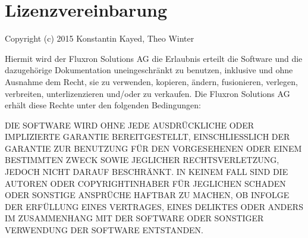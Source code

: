 \WFclear
\pagebreak
\section{Lizenzvereinbarung}
\label{Lizenzvereinbarung}

Copyright (c) 2015 Konstantin Kayed, Theo Winter

Hiermit wird der Fluxron Solutions AG die Erlaubnis erteilt die Software und die dazugehörige Dokumentation uneingeschränkt zu benutzen, inklusive und ohne Ausnahme dem Recht, sie zu verwenden, kopieren, ändern, fusionieren, verlegen, verbreiten, unterlizenzieren und/oder zu verkaufen. Die Fluxron Solutions AG erhält diese Rechte unter den folgenden Bedingungen:

DIE SOFTWARE WIRD OHNE JEDE AUSDRÜCKLICHE ODER IMPLIZIERTE GARANTIE BEREITGESTELLT, EINSCHLIESSLICH DER GARANTIE ZUR BENUTZUNG FÜR DEN VORGESEHENEN ODER EINEM BESTIMMTEN ZWECK SOWIE JEGLICHER RECHTSVERLETZUNG, JEDOCH NICHT DARAUF BESCHRÄNKT. IN KEINEM FALL SIND DIE AUTOREN ODER COPYRIGHTINHABER FÜR JEGLICHEN SCHADEN ODER SONSTIGE ANSPRÜCHE HAFTBAR ZU MACHEN, OB INFOLGE DER ERFÜLLUNG EINES VERTRAGES, EINES DELIKTES ODER ANDERS IM ZUSAMMENHANG MIT DER SOFTWARE ODER SONSTIGER VERWENDUNG DER SOFTWARE ENTSTANDEN.

\pagebreak

